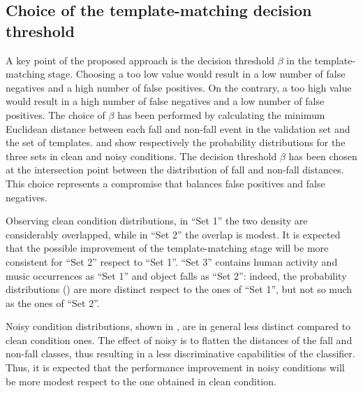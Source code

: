 \subsection{Choice of the template-matching decision threshold}\label{ssec:templateThreshold}
A key point of the proposed approach is the decision threshold $\beta$ in the template-matching stage. Choosing a too low value would result in a low number of false negatives and a high number of false positives. On the contrary, a too high value would result in a high number of false negatives and a low number of false positives. The choice of $\beta$ has been performed by calculating the minimum Euclidean distance between each fall and non-fall event in the validation set and the set of templates.  and  show respectively the probability distributions for the three sets in clean and noisy conditions. The decision threshold $\beta$ has been chosen at the intersection point between the distribution of fall and non-fall distances. This choice represents a compromise that balances false positives and false negatives.

Observing clean condition distributions, in ``Set 1'' the two density are considerably overlapped, while in ``Set 2'' the overlap is modest. It is expected that the possible improvement of the template-matching stage will be more consistent for ``Set 2'' respect to ``Set 1''. ``Set 3'' contains human activity and music occurrences as ``Set 1'' and object falls as ``Set 2'': indeed, the probability distributions () are more distinct respect to the ones of ``Set 1'', but not so much as the ones of ``Set 2''.

Noisy condition distributions, shown in , are in general less distinct compared to clean condition ones. The effect of noisy is to flatten the distances of the fall and non-fall classes, thus resulting in a less discriminative capabilities of the classifier. Thus, it is expected that the performance improvement in noisy conditions will be more modest respect to the one obtained in clean condition.

